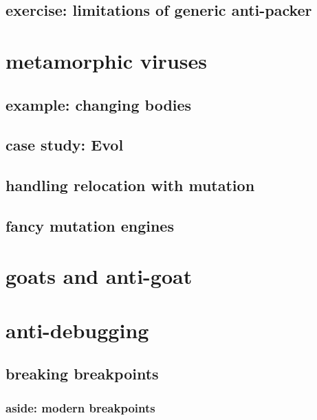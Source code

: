 \subsection{exercise: limitations of generic anti-packer}


\section{metamorphic viruses}


\subsection{example: changing bodies}


\subsection{case study: Evol}


\subsection{handling relocation with mutation}


\subsection{fancy mutation engines}


\section{goats and anti-goat}


\section{anti-debugging}


\subsection{breaking breakpoints}



\subsubsection{aside: modern breakpoints}


